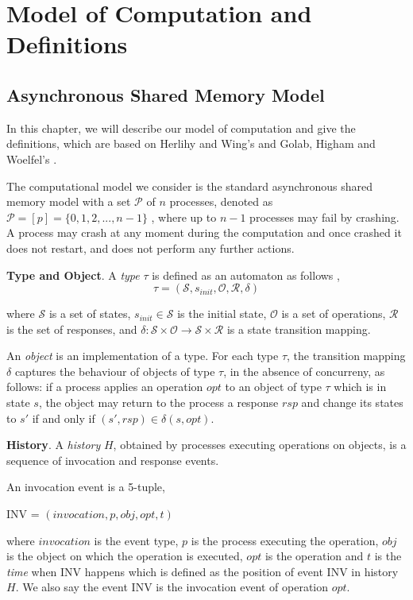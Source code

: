 \chapter{Model of Computation and Definitions}
\section{Asynchronous Shared Memory Model}
In this chapter, we will describe our model of computation and give the definitions, which are based on Herlihy
and Wing's \cite{Herlihy:1990:LCC:78969.78972} and Golab, Higham and Woelfel's \cite{golab2011linearizable}.

The computational model we consider is the standard asynchronous shared memory model with a set $\mathcal{P}$
of $n$ processes, denoted as $\mathcal{P} = [p] =\{0, 1, 2,..., n-1\}$ , where up to $n-1$ processes may fail by crashing.
A process may crash at any moment during the computation and once crashed it does not restart,
and does not perform any further actions.

\textbf{Type and Object}.
A \emph{type} $\tau$ is defined as an automaton as follows \cite{InProc-GHHW2007a},
$$\tau = (\mathcal{S}, s_{init},\mathcal{O},\mathcal{R} ,\delta )$$

where $\mathcal{S}$ is a set of states, $s_{init} \in \mathcal{S}$ is the initial state, $\mathcal{O}$ is a set of
operations, $\mathcal{R}$ is the set of responses, and
$\delta :\mathcal{S} \times \mathcal{O} \to \mathcal{S} \times \mathcal{R}$ is a state transition mapping.

An \emph{object} is an implementation of a type. For each type $\tau$, the transition mapping $\delta$ captures the
behaviour of objects of type $\tau$, in the absence of concurreny,
as follows: if a process applies an operation $opt$ to an object of type $\tau$ which is in state $s$, the object
may return to the process a response $rsp$ and change its states to $s'$ if and only if $(s', rsp) \in \delta(s, opt)$.

\textbf{History}.
A \emph{history} $H$, obtained by processes executing
operations on objects, is a sequence of invocation
and response events.

An invocation event is a 5-tuple,
\begin{center}
INV = $(invocation, p, obj, opt, t)$
\end{center}
where $invocation$ is the event type, $p$ is the process executing the operation, $obj$ is the object on which the operation
is executed, $opt$ is the operation and $t$ is the \emph{time} when INV happens which is defined
as the position of event INV in history $H$. We also say the event INV is the invocation event of operation $opt$.

